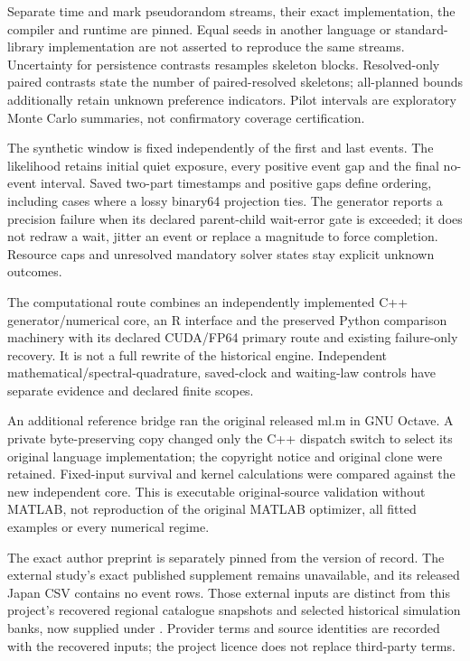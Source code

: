 Separate time and mark pseudorandom streams, their exact implementation, the compiler and runtime are pinned. Equal seeds in another language or standard-library implementation are not asserted to reproduce the same streams. Uncertainty for persistence contrasts resamples skeleton blocks. Resolved-only paired contrasts state the number of paired-resolved skeletons; all-planned bounds additionally retain unknown preference indicators. Pilot intervals are exploratory Monte Carlo summaries, not confirmatory coverage certification.

The synthetic window is fixed independently of the first and last events. The likelihood retains initial quiet exposure, every positive event gap and the final no-event interval. Saved two-part timestamps and positive gaps define ordering, including cases where a lossy binary64 projection ties. The generator reports a precision failure when its declared parent-child wait-error gate is exceeded; it does not redraw a wait, jitter an event or replace a magnitude to force completion. Resource caps and unresolved mandatory solver states stay explicit unknown outcomes.

The computational route combines an independently implemented C++ generator/numerical core, an R interface and the preserved Python comparison machinery with its declared CUDA/FP64 primary route and existing failure-only recovery. It is not a full rewrite of the historical engine. Independent mathematical/spectral-quadrature, saved-clock and waiting-law controls have separate evidence and declared finite scopes.

An additional reference bridge ran the original released ml.m in GNU Octave. A private byte-preserving copy changed only the C++ dispatch switch to select its original language implementation; the copyright notice and original clone were retained. Fixed-input survival and kernel calculations were compared against the new independent core. This is executable original-source validation without MATLAB, not reproduction of the original MATLAB optimizer, all fitted examples or every numerical regime.

The exact author preprint is separately pinned from the version of record. The external study's exact published supplement remains unavailable, and its released Japan CSV contains no event rows. Those external inputs are distinct from this project's recovered regional catalogue snapshots and selected historical simulation banks, now supplied under . Provider terms and source identities are recorded with the recovered inputs; the project licence does not replace third-party terms.

